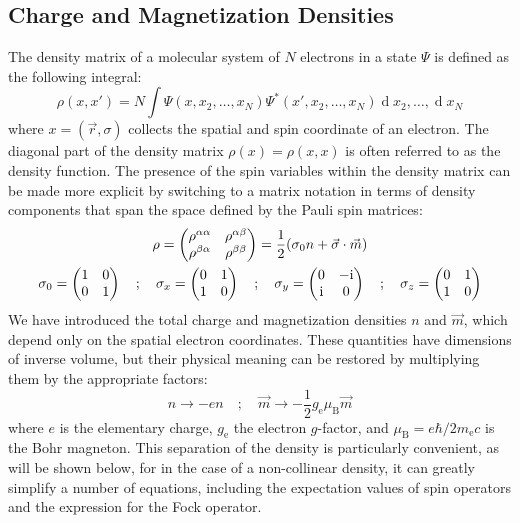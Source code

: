 \documentclass[12pt]{article}
\newcommand{\dd}{\operatorname{d}}
\newcommand{\iu}{\ensuremath\mathrm{i}}
\begin{document}
\subsection{Charge and Magnetization Densities}
The density matrix of a molecular system of $N$ electrons in a state $\Psi$ is defined as the following integral:
\begin{equation}
 \rho(x,x') = N\int\Psi(x,x_2,\dots,x_N)\Psi^*(x',x_2,\dots,x_N)\dd x_2,\dots,\dd x_N
\end{equation}
where $x=(\vec{r},\sigma)$ collects the spatial and spin coordinate of an electron.
The diagonal part of the density matrix $\rho(x)=\rho(x,x)$ is often referred to as the density function.
The presence of the spin variables within the density matrix can be made more explicit by switching to a matrix notation in terms of density components that span the space defined by the Pauli spin matrices:
\begin{gather}
 \rho = \begin{pmatrix} \rho^{\alpha\alpha} & \rho^{\alpha\beta} \\ \rho^{\beta\alpha} & \rho^{\beta\beta} \end{pmatrix} =
  \frac{1}{2}(\sigma_0n+\vec{\sigma}\cdot\vec{m}) \\
 \sigma_0 = \begin{pmatrix} 1 & 0    \\   0 & 1 \end{pmatrix} \quad;\quad
 \sigma_x = \begin{pmatrix} 0 & 1    \\   1 & 0 \end{pmatrix} \quad;\quad
 \sigma_y = \begin{pmatrix} 0 & -\iu \\ \iu & 0 \end{pmatrix} \quad;\quad
 \sigma_z = \begin{pmatrix} 0 & 1    \\   1 & 0 \end{pmatrix}
\end{gather}
We have introduced the total charge and magnetization densities $n$ and $\vec{m}$, which depend only on the spatial electron coordinates.
These quantities have dimensions of inverse volume, but their physical meaning can be restored by multiplying them by the appropriate factors:
\begin{equation}
 n\rightarrow -en \quad;\quad \vec{m}\rightarrow-\frac{1}{2}g_\mathrm{e}\mu_\mathrm{B}\vec{m}
\end{equation}
where $e$ is the elementary charge, $g_\mathrm{e}$ the electron $g$-factor, and $\mu_\mathrm{B}=e\hbar/2m_\mathrm{e}c$ is the Bohr magneton.
This separation of the density is particularly convenient, as will be shown below, for in the case of a non-collinear density, it can greatly simplify a number of equations, including the expectation values of spin operators and the expression for the Fock operator.
\end{document}
